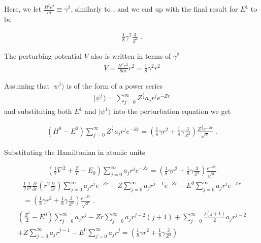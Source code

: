     \noindent Here, we let $\frac{B^2 e^2}{m} \equiv \gamma^2$, similarly to \cite{Killingbeck_1979}, and we end up with the final result for $E^1$ to be 

    \begin{align}
        \frac{1}{8} \gamma^2 \frac{3}{Z^2}\;.
    \end{align}

    \noindent The perturbing potential $V$ also is written in terms of $\gamma^2$
    \begin{align}
        V = \frac{B^2 e^2}{8m} r^2 = \frac{1}{8} \gamma^2 r^2
    \end{align}

    \noindent Assuming that $\vert \psi^1 \rangle$ is of the form of a power series 
    \begin{align}
        \vert \psi^1 \rangle = \sum_{j = 0}^\infty Z^{\frac{3}{2}} a_j r^j e^{-Zr}
    \end{align}
    \noindent and substituting both $E^1$ and $\vert \psi^1 \rangle$ into the perturbation equation we get 

    \begin{align}
        \left(H^0 - E^0 \right) \sum_{j = 0}^\infty Z^{\frac{3}{2}} a_j r^j e^{-Zr} = \left( \frac{1}{8} \gamma r^2 + \frac{1}{8} \gamma \frac{3}{Z^2} \right) \frac{Z^{\frac{3}{2}} e^{-Zr}}{\sqrt{\pi}}\;.
    \end{align}

    Substituting the Hamiltonian in atomic units 

    \begin{align}
        \left(\frac{1}{2}\nabla^2 + \frac{Z}{r} - E_0\right) \sum_{j = 0}^\infty a_j r^j e^{-Zr} = \left(\frac{1}{8} \gamma r^2 + \frac{1}{8} \gamma \frac{3}{Z^2} \right) \frac{e^{-Zr}}{\sqrt{\pi}}
    \end{align}
    \begin{align}
        \frac{1}{2} \frac{1}{r^2} \frac{\partial}{\partial r} \left(r^2 \frac{\partial}{\partial r} \right) \sum_{j = 0}^\infty a_j r^j e^{-Zr} + Z \sum_{j = 0}^\infty a_j r^{j - 1} e^{-Zr} - E^0 \sum_{j = 0}^\infty a_j r^j e^{-Zr} \nonumber\\ = \left(\frac{1}{8} \gamma r^2 + \frac{1}{8} \gamma \frac{3}{Z^2} \right) \frac{e^{-Zr}}{\sqrt{\pi}}\;.
    \end{align}
    \begin{align}
        \left( \frac{Z^2}{2} - E^0\right) \sum_{j = 0}^\infty a_j r^j - Zr \sum_{j = 0}^\infty a_j r^{j -2} (j + 1) + \sum_{j = 0}^\infty \frac{j(j+1)}{2} a_j r^{j - 2} \nonumber\\+ Z \sum_{j = 0}^\infty a_j r^{j -1} - E^0 \sum_{j = 0}^\infty a_j r^j = \left(\frac{1}{8} \gamma r^2 + \frac{1}{8} \gamma \frac{3}{Z^2} \right)
    \end{align}

